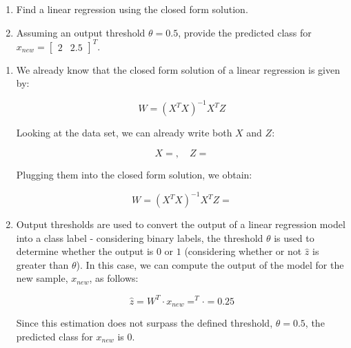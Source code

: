 \documentclass[12pt]{article}
\begin{document}
\begin{enumerate}[leftmargin=\labelsep]
{        \begin{enumerate}
          \item Find a linear regression using the closed form solution.
          \item Assuming an output threshold $\theta = 0.5$, provide the predicted class for $x_{new} = \begin{bmatrix} 2 & 2.5 \end{bmatrix}^T$.
        \end{enumerate}
        }

        \begin{enumerate}
          \item {
                We already know that the closed form solution of a linear regression
                is given by:

                \begin{equation*}
                  W = (X^T X)^{-1} X^T Z
                \end{equation*}

                Looking at the data set, we can already write both $X$ and $Z$:

                \begin{equation*}
                  X = , \quad Z = 
                \end{equation*}

                Plugging them into the closed form solution, we obtain:

                $$
                  W = (X^T X)^{-1} X^T Z = 
                $$
                }
          \item {
                Output thresholds are used to convert the output of a linear regression
                model into a class label - considering binary labels, the threshold
                $\theta$ is used to determine whether the output is $0$ or $1$ (considering
                whether or not $\hat{z}$ is greater than $\theta$). In this case, we can
                compute the output of the model for the new sample, $x_{new}$, as follows:

                $$
                  \hat{z} = W^T \cdot x_{new}
                  = ^T \cdot 
                  = 0.25
                $$

                Since this estimation does not surpass the defined threshold, $\theta = 0.5$,
                the predicted class for $x_{new}$ is $0$.
                }
        \end{enumerate}


\end{enumerate}
\end{document}
